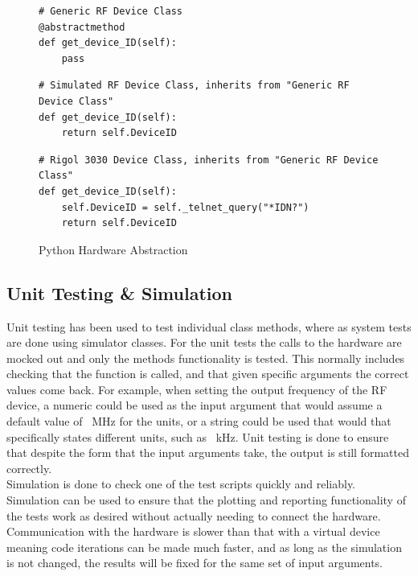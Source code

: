 \documentclass[a4paper, 11pt]{article}
\begin{document}
\begin{figure}[H]
\begin{verbatim}
# Generic RF Device Class
@abstractmethod
def get_device_ID(self):
	pass
\end{verbatim}
\begin{verbatim}
# Simulated RF Device Class, inherits from "Generic RF Device Class" 
def get_device_ID(self):
	return self.DeviceID
\end{verbatim}
\begin{verbatim}
# Rigol 3030 Device Class, inherits from "Generic RF Device Class" 
def get_device_ID(self):
	self.DeviceID = self._telnet_query("*IDN?")
	return self.DeviceID
\end{verbatim}
\caption{Python Hardware Abstraction}
\label{fig:abstraction.py}
\end{figure}

\subsection{Unit Testing \& Simulation}
Unit testing has been used to test individual class methods, where as system tests are done using simulator classes. For the unit tests the calls to the hardware are mocked out and only the methods functionality is tested. This normally includes checking that the function is called, and that given specific arguments the correct values come back. For example, when setting the output frequency of the RF device, a numeric could be used as the input argument that would assume a default value of \SI{}{\mega\hertz} for the units, or a string could be used that would that specifically states different units, such as \SI{}{\kilo\hertz}. Unit testing is done to ensure that despite the form that the input arguments take, the output is still formatted correctly. \\
Simulation is done to check one of the test scripts quickly and reliably. Simulation can be used to ensure that the plotting and reporting functionality of the tests work as desired without actually needing to connect the hardware. Communication with the hardware is slower than that with a virtual device meaning code iterations can be made much faster, and as long as the simulation is not changed, the results will be fixed for the same set of input arguments.
\end{document}
